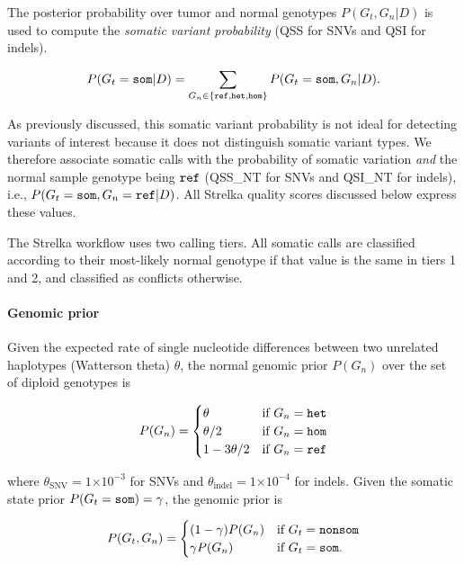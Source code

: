 \documentclass{article}
\newcommand{\e}[1]{\ensuremath{\times 10^{#1}}}
\begin{document}
The posterior probability over tumor and normal genotypes $P(G_t,G_n|D)$ is used to compute the {\em somatic variant probability} (QSS for SNVs and QSI for indels).

\begin{equation*}
	P(G_t = {\tt som} | D) = \sum_{G_n \in \{ {\tt ref}, {\tt het}, \tt{hom} \}}{P(G_t={\tt som},G_n|D)}.
\end{equation*}

As previously discussed, this somatic variant probability is not ideal for detecting variants of interest because it does not distinguish somatic variant types. We therefore associate somatic calls with the probability of somatic variation {\em and} the normal sample genotype being $\tt ref$ (QSS\_NT for SNVs and QSI\_NT for indels), i.e., $P(G_t = {\tt som}, G_n = {\tt ref} | D)$. All Strelka quality scores discussed below express these values.

The Strelka workflow uses two calling tiers. All somatic calls are classified according to their most-likely normal genotype if that value is the same in tiers 1 and 2, and classified as conflicts otherwise.

\paragraph{Genomic prior}
Given the expected rate of single nucleotide differences between two unrelated haplotypes (Watterson theta) $\theta$, the normal genomic prior $P(G_n)$ over the set of diploid genotypes is

\begin{equation*}
P(G_n)=
\begin{cases}
	\theta & \text{if } G_n = {\tt het} \\
	\theta/2 & \text{if } G_n = {\tt hom} \\
	1 - 3\theta/2 & \text{if } G_n = {\tt ref} \\
\end{cases}
\end{equation*}

\noindent where $\theta_{\text{SNV}}=1\e{-3}$ for SNVs and $\theta_{\text{indel}}=1\e{-4}$ for indels. Given the somatic state prior $P(G_t={\tt som}) = \gamma$, the genomic prior is

\begin{equation*}
P(G_t, G_n)=
\begin{cases}
	(1 - \gamma) P(G_n) & \text{if } G_t = {\tt nonsom} \\
	\gamma P(G_n) & \text{if } G_t = {\tt som}. \\
\end{cases}
\end{equation*}
\end{document}
